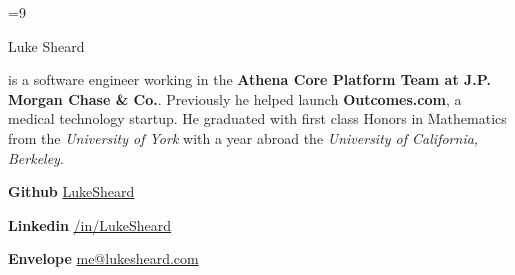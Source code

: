 \documentclass{article}
\newcommand{\social}[3]{
   	\textbf{#1}
   	\hspace{10pt}
	\href{#2}{#3}
}
\begin{document}
\color{body}

=9\relax     %

\raggedright

\fontsize{10pt}{13pt}\selectfont


{\Huge Luke Sheard}

\vspace{10pt}

is a software engineer working in the \textbf{Athena Core Platform Team at J.P. Morgan Chase \& Co.}. Previously he helped launch \textbf{Outcomes.com}, a medical technology startup. He graduated with first class Honors in Mathematics from the \textit{University of York} with a year abroad the \textit{University of California, Berkeley}.

\vspace{5pt}

\social{Github}{https://www.github.com/LukeSheard}{LukeSheard}
\social{Linkedin}{https://www.linkedin.com/in/lukesheard}{/in/LukeSheard}
\social{Envelope}{mailto:me@lukesheard.com}{me@lukesheard.com}

\vspace{15pt}
\end{document}
